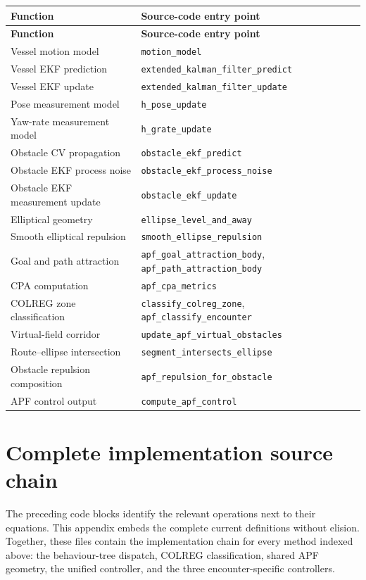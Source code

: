 \documentclass[11pt,a4paper]{article}
\begin{document}
\begin{longtable}{>{\raggedright\arraybackslash}p{}p{}}
\toprule
\textbf{Function} & \textbf{Source-code entry point} \\
\midrule
\endfirsthead
\toprule
\textbf{Function} & \textbf{Source-code entry point} \\
\midrule
\endhead
Vessel motion model & \texttt{motion\_model} \\
Vessel EKF prediction & \texttt{extended\_kalman\_filter\_predict} \\
Vessel EKF update & \texttt{extended\_kalman\_filter\_update} \\
Pose measurement model & \texttt{h\_pose\_update} \\
Yaw-rate measurement model & \texttt{h\_grate\_update} \\
Obstacle CV propagation & \texttt{obstacle\_ekf\_predict} \\
Obstacle EKF process noise & \texttt{obstacle\_ekf\_process\_noise} \\
Obstacle EKF measurement update & \texttt{obstacle\_ekf\_update} \\
Elliptical geometry & \texttt{ellipse\_level\_and\_away} \\
Smooth elliptical repulsion & \texttt{smooth\_ellipse\_repulsion} \\
Goal and path attraction & \texttt{apf\_goal\_attraction\_body}, \texttt{apf\_path\_attraction\_body} \\
CPA computation & \texttt{apf\_cpa\_metrics} \\
COLREG zone classification & \texttt{classify\_colreg\_zone}, \texttt{apf\_classify\_encounter} \\
Virtual-field corridor & \texttt{update\_apf\_virtual\_obstacles} \\
Route--ellipse intersection & \texttt{segment\_intersects\_ellipse} \\
Obstacle repulsion composition & \texttt{apf\_repulsion\_for\_obstacle} \\
APF control output & \texttt{compute\_apf\_control} \\
\bottomrule
\end{longtable}

\clearpage
\appendix
\section{Complete implementation source chain}

The preceding code blocks identify the relevant operations next to their
equations. This appendix embeds the complete current definitions without
elision. Together, these files contain the implementation chain for every
method indexed above: the behaviour-tree dispatch, COLREG classification,
shared APF geometry, the unified controller, and the three encounter-specific
controllers.
\end{document}
